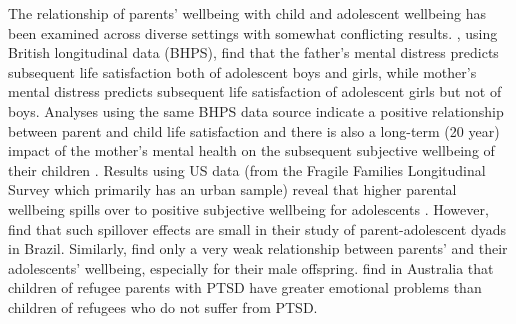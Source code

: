 \documentclass[11pt, letterpaper]{article}
\begin{document}
\begin{spacing}{1.9}
The relationship of parents' wellbeing with child and adolescent wellbeing has
been examined across diverse settings with somewhat conflicting
results. \citet{powdthavee2008}, using British longitudinal data (BHPS), find that the
father's mental distress predicts subsequent life satisfaction both of
adolescent boys and girls, while mother's mental distress predicts subsequent
life satisfaction of adolescent girls but not of boys. Analyses using the same
BHPS data source  indicate a positive relationship between parent and child
life satisfaction \citep{clair2012relationship} and there is also a long-term
(20 year) impact of the mother's mental health on the subsequent subjective
wellbeing of their children \citep{layard2014,clark2019}. Results using US data
(from the Fragile Families Longitudinal Survey which primarily has an urban
sample) reveal that higher parental wellbeing spills over to positive subjective
wellbeing for adolescents \citep{coles2022,park2024}.
However, \citet{bedin2014dyadic}  find that such spillover effects are small in
their study of parent-adolescent dyads in Brazil. Similarly,
\citet{casas2008does, casas2012testing}  find only a very weak relationship between parents' and their
adolescents' wellbeing, especially for their male offspring. 
\citet{bryant2018} find in Australia that children of refugee parents with PTSD
have greater emotional problems than children of refugees who do not suffer from
PTSD.


\end{spacing}
\end{document}
